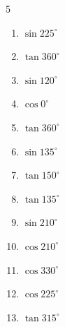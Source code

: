 \begin{multicols}{5}
\begin{enumerate}
  \item $\displaystyle \sin{225^\circ}$


  \item $\displaystyle \tan{360^\circ}$

        \phantom{$\displaystyle =0$}

  \item $\displaystyle \sin{120^\circ}$


  \item $\displaystyle \cos{0^\circ}$

        \phantom{$\displaystyle =1$}

\columnbreak %

  \item $\displaystyle \tan{360^\circ}$

        \phantom{$\displaystyle =0$}

  \item $\displaystyle \sin{135^\circ}$


  \item $\displaystyle \tan{150^\circ}$


  \item $\displaystyle \tan{135^\circ}$

        \phantom{$\displaystyle =-1$}

  \item $\displaystyle \sin{210^\circ}$


  \item $\displaystyle \cos{210^\circ}$


  \item $\displaystyle \cos{330^\circ}$


  \item $\displaystyle \cos{225^\circ}$


  \item $\displaystyle \tan{315^\circ}$


\end{enumerate}
\end{multicols}
